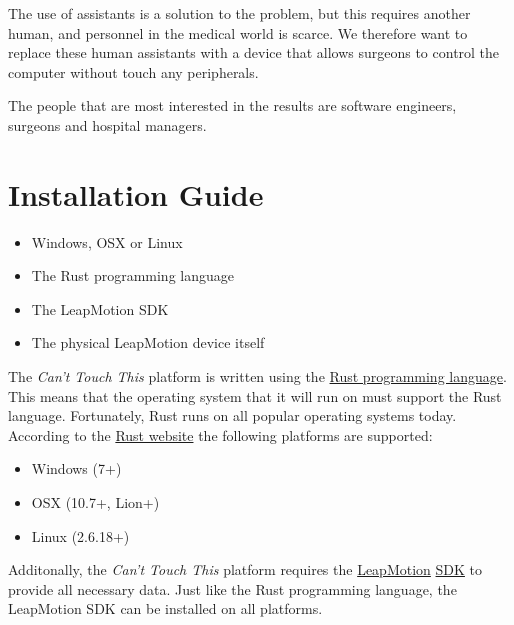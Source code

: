 \documentclass[a4paper]{article}
\providecommand{\tightlist}{%
\setlength{\itemsep}{0pt}\setlength{\parskip}{0pt}}
\begin{document}
  The use of assistants is a solution to the problem, but this requires another
  human, and personnel in the medical world is scarce. We therefore want to
  replace these human assistants with a device that allows surgeons to control
  the computer without touch any peripherals.

  The people that are most interested in the results are software engineers,
  surgeons and hospital managers.
  \clearpage

  \section{Installation Guide}
  \begin{itemize}
    \tightlist
    \item Windows, OSX or Linux
    \item The Rust programming language
    \item The LeapMotion SDK
    \item The physical LeapMotion device itself
  \end{itemize}

  The \textit{Can't Touch This} platform is written using the
  \href{https://www.rust-lang.org/en-US/}{Rust programming language}.
  This means that the operating system that it will run on must
  support the Rust language. Fortunately, Rust runs on all popular operating
  systems today. According to the
  \href{https://forge.rust-lang.org/platform-support.html}{Rust website} the
  following platforms are supported:

  \begin{itemize}
    \tightlist
    \item Windows (7+)
    \item OSX (10.7+, Lion+)
    \item Linux (2.6.18+)
  \end{itemize}

  Additonally, the \textit{Can't Touch This} platform requires the
  \href{https://www.leapmotion.com/}{LeapMotion}
  \href{https://developer.leapmotion.com/sdk/v2}{SDK} to provide all necessary
  data. Just like the Rust programming language, the LeapMotion SDK can be
  installed on all platforms.
  \clearpage

\end{document}
